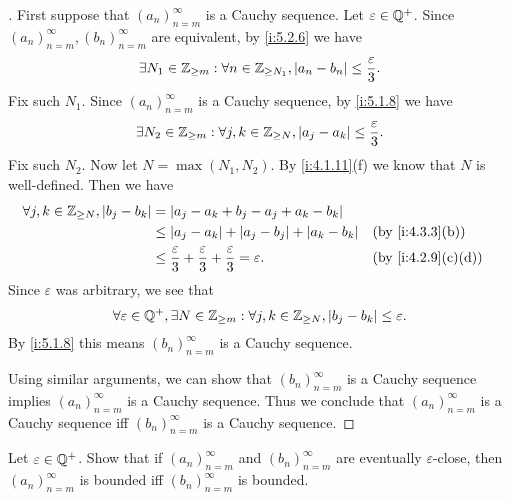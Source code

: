 \begin{proof}[]
  First suppose that \((a_n)_{n = m}^\infty\) is a Cauchy sequence.
  Let \(\varepsilon \in \mathbb{Q}^+\).
  Since \((a_n)_{n = m}^\infty, (b_n)_{n = m}^\infty\) are equivalent, by \cref{i:5.2.6} we have
  \[
    \exists N_1 \in \mathbb{Z}_{\geq m} : \forall n \in \mathbb{Z}_{\geq N_1}, \left\lvert a_n - b_n\right\rvert \leq \dfrac{\varepsilon}{3}.
  \]
  Fix such \(N_1\).
  Since \((a_n)_{n = m}^\infty\) is a Cauchy sequence, by \cref{i:5.1.8} we have
  \[
    \exists N_2 \in \mathbb{Z}_{\geq m} : \forall j, k \in \mathbb{Z}_{\geq N}, \left\lvert a_j - a_k\right\rvert \leq \dfrac{\varepsilon}{3}.
  \]
  Fix such \(N_2\).
  Now let \(N = \max(N_1, N_2)\).
  By \cref{i:4.1.11}(f) we know that \(N\) is well-defined.
  Then we have
  \begin{align*}
    \forall j, k \in \Z_{\geq N}, \abs{b_j - b_k} & = \abs{a_j - a_k + b_j - a_j + a_k - b_k}                                                                           \\
                                                  & \leq \abs{a_j - a_k} + \abs{a_j - b_j} + \abs{a_k - b_k}                                     &  & \by{i:4.3.3}[b]   \\
                                                  & \leq \dfrac{\varepsilon}{3} + \dfrac{\varepsilon}{3} + \dfrac{\varepsilon}{3} = \varepsilon. &  & \by{i:4.2.9}[c,d]
  \end{align*}
  Since \(\varepsilon\) was arbitrary, we see that
  \[
    \forall \varepsilon \in \mathbb{Q}^+, \exists N \in \mathbb{Z}_{\geq m} : \forall j, k \in \mathbb{Z}_{\geq N}, \left\lvert b_j - b_k\right\rvert \leq \varepsilon.
  \]
  By \cref{i:5.1.8} this means \((b_n)_{n = m}^\infty\) is a Cauchy sequence.

  Using similar arguments, we can show that \((b_n)_{n = m}^\infty\) is a Cauchy sequence implies \((a_n)_{n = m}^\infty\) is a Cauchy sequence.
  Thus we conclude that \((a_n)_{n = m}^\infty\) is a Cauchy sequence iff \((b_n)_{n = m}^\infty\) is a Cauchy sequence.
\end{proof}

\begin{ex}\label{i:ex:5.2.2}
  Let \(\varepsilon \in \mathbb{Q}^+\).
  Show that if \((a_n)_{n = m}^{\infty}\) and \((b_n)_{n = m}^{\infty}\) are eventually \(\varepsilon\)-close, then \((a_n)_{n = m}^{\infty}\) is bounded iff \((b_n)_{n = m}^{\infty}\) is bounded.
\end{ex}

